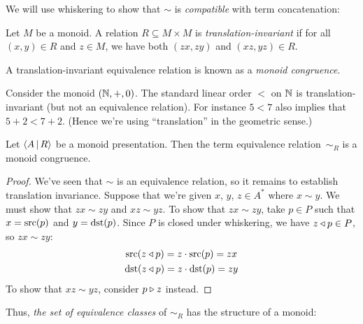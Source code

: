 \documentclass[../generics]{subfiles}
\begin{document}
We will use whiskering to show that $\sim$ is \emph{compatible} with term concatenation:
\begin{definition}\label{translation invariant def}
Let $M$ be a monoid. A relation $R\subseteq M\times M$ is \emph{translation-invariant} if for all $(x,y)\in R$ and $z\in M$, we have both $(zx,zy)$ and $(xz,yz)\in R$.
\end{definition}
A translation-invariant equivalence relation is known as a \emph{monoid congruence}.
\begin{example}
Consider the monoid $(\mathbb{N},+,0)$. The standard linear order $<$ on $\mathbb{N}$ is translation-invariant (but not an equivalence relation). For instance $5<7$ also implies that $5+2<7+2$. (Hence we're using ``translation'' in the geometric sense.)
\end{example}
\begin{theorem}
Let $\langle A\,|\,R\rangle$ be a monoid presentation. Then the term equivalence relation~$\sim_R$ is a monoid congruence.
\end{theorem}
\begin{proof}
We've seen that $\sim$ is an equivalence relation, so it remains to establish translation invariance. Suppose that we're given $x$, $y$, $z\in A^*$ where $x\sim y$. We must show that $zx\sim zy$ and $xz\sim yz$. To show that $zx\sim zy$, take $p\in P$ such that $x=\operatorname{src}(p)$ and $y=\operatorname{dst}(p)$. Since $P$ is closed under whiskering, we have $z\triangleleft p\in P$, so $zx\sim zy$:
\begin{gather*}
\operatorname{src}(z\triangleleft p)=z\cdot \operatorname{src}(p)=zx\\
\operatorname{dst}(z\triangleleft p)=z\cdot \operatorname{dst}(p)=zy
\end{gather*}
To show that $xz \sim yz$, consider $p\triangleright z$ instead.
\end{proof}

Thus, \emph{the set of equivalence classes} of $\sim_R$ has the structure of a monoid:
\end{document}

